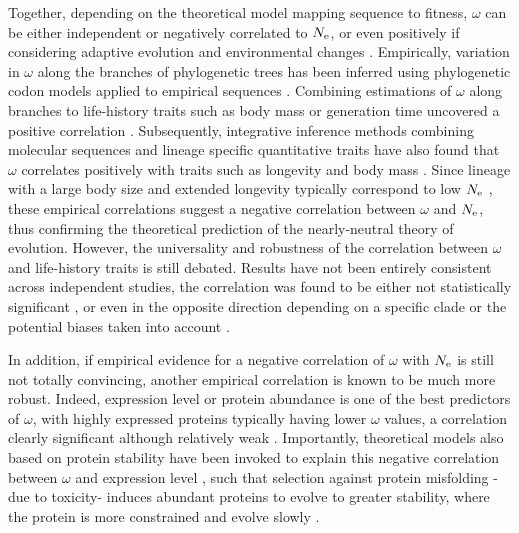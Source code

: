 Together, depending on the theoretical model mapping sequence to fitness, $\omega$ can be either independent or negatively correlated to $N_{\mathrm{e}}$, or even positively if considering adaptive evolution and environmental changes \citep{Lanfear2014}.
Empirically, variation in $\omega$ along the branches of phylogenetic trees has been inferred using phylogenetic \gls{codon} models applied to empirical sequences \citep{Yang2001, Zhang2004}. 
Combining estimations of $\omega$ along branches to life-history traits such as body mass or generation time uncovered a positive correlation \citep{Popadin2007, Nikolaev2007}.
Subsequently, integrative inference methods combining molecular sequences and lineage specific quantitative traits have also found that $\omega$ correlates positively with traits such as longevity and body mass \citep{Lartillot2011, Figuet2017}.
Since lineage with a large body size and extended longevity typically correspond to low $N_{\mathrm{e}}$ \citep{Romiguier2014}, these empirical correlations suggest a negative correlation between $\omega$ and $N_{\mathrm{e}}$, thus confirming the theoretical prediction of the \gls{nearly-neutral} theory of evolution.
However, the universality and robustness of the correlation between $\omega$ and life-history traits is still debated. 
Results have not been entirely consistent across independent studies, the correlation was found to be either not statistically significant \citep{Lartillot2012}, or even in the opposite direction depending on a specific clade or the potential biases taken into account \citep{Lanfear2010, Nabholz2013, Lanfear2014, Figuet2016}.

In addition, if empirical evidence for a negative correlation of $\omega$ with $N_{\mathrm{e}}$ is still not totally convincing, another empirical correlation is known to be much more robust.
Indeed, expression level or protein abundance is one of the best predictors of $\omega$, with highly expressed proteins typically having lower $\omega$ values, a correlation clearly significant although relatively weak \citep{Duret2000, Rocha2004, Drummond2005a, Zhang2015, Song2017}.
Importantly, theoretical models also based on protein stability have been invoked to explain this negative correlation between $\omega$ and expression level \citep{Wilke2006, Drummond2008}, such that selection against protein misfolding -due to toxicity- induces abundant proteins to evolve to greater stability, where the protein is more constrained and evolve slowly \citep{Serohijos2012}.

